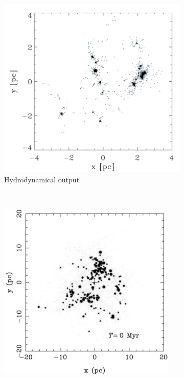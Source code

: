 \begin{figure}
\center
    \centering
    \begin{subfigure}[b]{0.48\textwidth}
        \includegraphics[width=\textwidth]{Figures/0_bonnell.png}
        \caption{Hydrodynamical output}
        \label{Fig:0_substructure_0}
    \end{subfigure}
    ~~
    \begin{subfigure}[b]{0.48\textwidth}
        \includegraphics[width=0.93\textwidth]{Figures/0_fujii.png}

\end{subfigure}
\end{figure}
